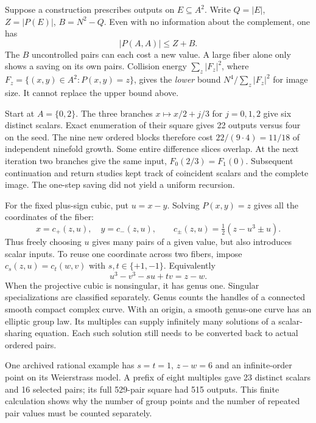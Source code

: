 Suppose a construction prescribes outputs on $E\subseteq A^2$. Write $Q=|E|$, $Z=|P(E)|$, $B=N^2-Q$. Even with no information about the complement, one has
\[
 |P(A,A)|\le Z+B.
\]
The $B$ uncontrolled pairs can each cost a new value. A large fiber alone only shows a saving on its own pairs. Collision energy $\sum_z |F_z|^2$, where $F_z=\{(x,y)\in A^2:P(x,y)=z\}$, gives the \emph{lower} bound $N^4/\sum_z |F_z|^2$ for image size. It cannot replace the upper bound above.

Start at $A=\{0,2\}$. The three branches $x\mapsto x/2+j/3$ for $j=0,1,2$ give six distinct scalars. Exact enumeration of their square gives 22 outputs versus four on the seed. The nine new ordered blocks therefore cost $22/(9\cdot4)=11/18$ of independent ninefold growth. Some entire difference slices overlap. At the next iteration two branches give the same input, $F_0(2/3)=F_1(0)$. Subsequent continuation and return studies kept track of coincident scalars and the complete image. The one-step saving did not yield a uniform recursion. 

For the fixed plus-sign cubic, put $u=x-y$. Solving $P(x,y)=z$ gives all the coordinates of the fiber:
\[
 x=c_+(z,u),\quad y=c_-(z,u),\qquad
 c_\pm(z,u)=\tfrac12(z-u^3\pm u).
\]
Thus freely choosing $u$ gives many pairs of a given value, but also introduces scalar inputs. To reuse one coordinate across two fibers, impose $c_s(z,u)=c_t(w,v)$ with $s,t\in\{+1,-1\}$. Equivalently
\[
 u^3-v^3-su+tv=z-w.
\]
When the projective cubic is nonsingular, it has genus one. Singular specializations are classified separately. Genus counts the handles of a connected smooth compact complex curve. With an origin, a smooth genus-one curve has an elliptic group law. Its multiples can supply infinitely many solutions of a scalar-sharing equation. Each such solution still needs to be converted back to actual ordered pairs. 

One archived rational example has $s=t=1$, $z-w=6$ and an infinite-order point on its Weierstrass model. A prefix of eight multiples gave 23 distinct scalars and 16 selected pairs; its full 529-pair square had 515 outputs. This finite calculation shows why the number of group points and the number of repeated pair values must be counted separately. 

